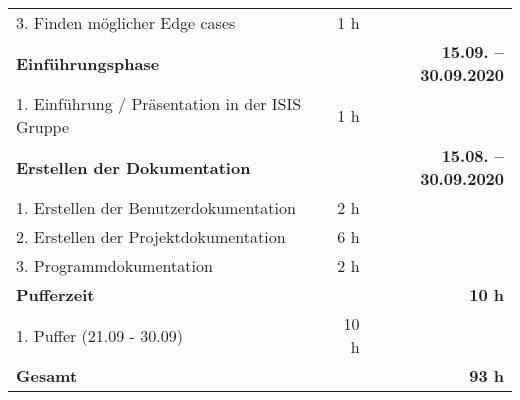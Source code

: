 \begin{tabularx}{\textwidth}{Xrrr}
3. Finden m\"oglicher Edge cases &       & 1 h   &  \\
\rowcolor{heading}\textbf{Einführungsphase} & \textbf{} & \textbf{} & \textbf{15.09. -- 30.09.2020} \\
1. Einführung / Pr\"asentation in der ISIS Gruppe &       & 1 h   &  \\
\rowcolor{heading}\textbf{Erstellen der Dokumentation} & \textbf{} & \textbf{} & \textbf{15.08. -- 30.09.2020} \\
1. Erstellen der Benutzerdokumentation &       & 2 h   &  \\
\rowcolor{odd}2. Erstellen der Projektdokumentation &       & 6 h   &  \\
3. Programmdokumentation &       & 2 h   &  \\
\rowcolor{heading}\textbf{Pufferzeit} & \textbf{} & \textbf{} & \textbf{10 h} \\
1. Puffer (21.09 - 30.09) &       & 10 h   &  \\
\hline
\hline
\rowcolor{heading}\textbf{Gesamt} & \textbf{} & \textbf{} & \textbf{93 h} \\
\end{tabularx}
